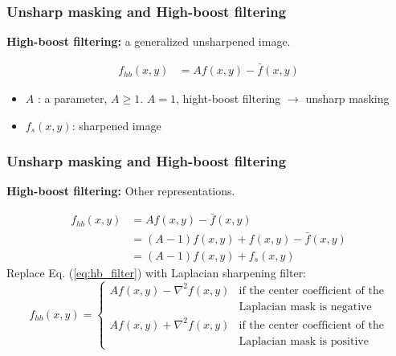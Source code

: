 \documentclass[english,11pt,table,handout]{beamer}
\begin{document}
\frame
{
	\frametitle{Unsharp masking and High-boost filtering}
	\textbf{High-boost filtering:}  a generalized unsharpened image.
	
	\begin{align}
	\nonumber
	f_{hb}(x,y) &= Af(x,y) - \bar{f}(x,y)
	\end{align}
	\begin{itemize}
		\item $A$ : a parameter, $A \ge 1$. $A=1$, hight-boost filtering $\rightarrow$ unsharp masking
		\item $f_s(x,y)$: sharpened image
	\end{itemize}
}
\frame
{
	\frametitle{Unsharp masking and High-boost filtering}
	\textbf{High-boost filtering:}  Other representations.
	
	\begin{align}
	\nonumber
	f_{hb}(x,y) &= Af(x,y) - \bar{f}(x,y)\\
	\nonumber
				&= (A-1)f(x,y) + f(x,y) - \bar{f}(x,y)\\
				&= (A-1)f(x,y)  + f_s(x,y) \label{eq:hb_filter}
	\end{align}
	Replace Eq. (\ref{eq:hb_filter}) with Laplacian sharpening filter:
	\small
	$$
	f_{hb}(x,y) =
	\begin{cases}
	Af(x,y) - \nabla^2f(x,y)& 	\text{if the center coefficient of the}\\
	& \text{Laplacian mask is negative }\\
	Af(x,y) + \nabla^2f(x,y)& 	\text{if the center coefficient of the} \\
	&  \text{Laplacian mask is positive }
	\end{cases}
	$$
	
}
\frame
\end{document}
